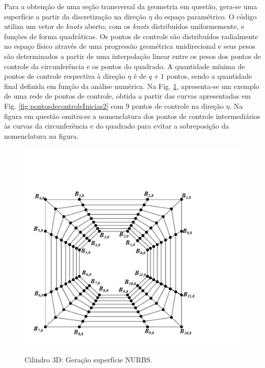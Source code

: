 \documentclass[tese_patricia]{subfiles}
\begin{document}
Para a obtenção de uma seção transversal da geometria em questão, gera-se uma superfície a partir da discretização na direção $\eta$ do espaço paramétrico. O código utiliza um vetor de \textit{knots} aberto, com os 
\textit{knots} distribuídos uniformemente, e funções de forma quadráticas. Os pontos de controle são distribuídos radialmente no espaço físico através de uma progressão geométrica unidirecional e seus pesos são determinados a partir de uma interpolação linear entre os pesos dos pontos de controle da circunferência e os pontos do quadrado. A quantidade mínima de pontos de controle respectiva à direção $\eta$ é de $q+1$ pontos, sendo a quantidade final definida em função da análise numérica. Na Fig. \ref{fig:superficieNURBcilindro}, apresenta-se um exemplo de uma rede de pontos de controle, obtida a partir das curvas apresentadas em Fig. \ref {fig:pontosdecontroleInicias2} com 9 pontos de controle na direção $\eta$. Na figura em questão omitiu-se a nomenclatura dos pontos de controle intermediários às curvas da circunferência e do quadrado para evitar a sobreposição da nomenclatura na figura.


\begin{figure}[htb!]
	\centering 
	\includegraphics[scale=0.4,trim=1cm 1cm 5cm 4cm, clip=true]{Imagens/Cap3/escoamentosobrecilindro3.pdf}	
	\label{fig:superficieNURBcilindro}
	\caption{Cilindro 3D: Geração superfície NURBS.}
\end{figure}
\end{document}

